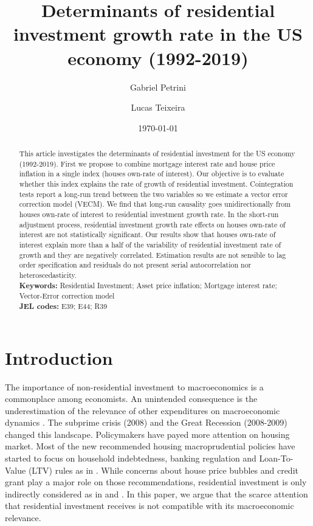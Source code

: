 \documentclass[12pt, a4paper]{article}
\author[1]{Gabriel Petrini}
\affil[1]{PhD Student at University of Campinas (Brazil), Email: \url{gpetrinidasilveira@gmail.com}} %
\author[2]{Lucas Teixeira}
\affil[2]{Assistant Professor at University of Campinas (Brazil), Email: \url{lucastei@unicamp.br}} %
\date{\today}
\title{Determinants of residential investment growth rate in the US economy (1992-2019)}
\begin{document}
\maketitle





\begin{abstract}
This article investigates the determinants of residential investment for the US economy (1992-2019).
First we propose to combine mortgage interest rate and house price inflation in a single index (houses own-rate of interest).
Our objective is to evaluate whether this index explains the rate of growth of residential investment.
Cointegration tests report a long-run trend between the two variables so we estimate a vector error correction model (VECM).
We find that long-run causality goes unidirectionally from houses own-rate of interest to residential investment growth rate.
In the short-run adjustment process, residential investment growth rate effects on houses own-rate of interest are not statistically significant.
Our results show that houses own-rate of interest explain more than a half of the variability of residential investment rate of growth and they are negatively correlated.
Estimation results are not sensible to lag order specification and residuals do not present serial autocorrelation nor heteroscedasticity.
\\
\noindent \textbf{Keywords:} Residential Investment; Asset price inflation; Mortgage interest rate; Vector-Error correction model\\
\noindent \textbf{JEL codes:} E39; E44; R39
\end{abstract}


\section{Introduction}
\label{sec:orgf450c68}
\label{sec:Introduction}
The importance of non-residential investment to macroeconomics is a commonplace among economists.
An unintended consequence is the underestimation of the relevance of other expenditures on macroeconomic dynamics \parencite{brochier_macroeconomics_2017}.
The subprime crisis (2008) and the Great Recession (2008-2009) changed this landscape.
Policymakers have payed more attention on housing market.
Most of the new recommended housing macroprudential policies have started to focus on household indebtedness, banking regulation and Loan-To-Value (LTV) rules as in \textcite{arena_2020_Macroprudential}.
While concerns about house price bubbles and credit grant play a major role on those recommendations, residential investment is only indirectly considered as in \textcite{baptista_2016_Macroprudential} and \textcite{Ozel2019}.
In this paper, we argue that the scarce attention that residential investment receives is not compatible with its macroeconomic relevance.
\end{document}
